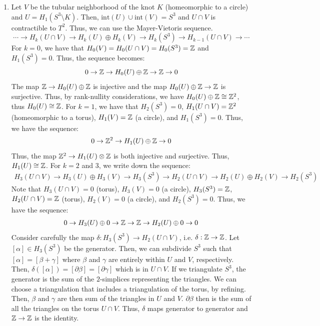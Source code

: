 \documentclass[12pt]{article}
\begin{document}
\begin{solution}
\begin{enumerate}
        \item Let $V$ be the tubular neighborhood of the knot $K$ (homeomorphic to a circle) and $U = H_1(S^3 \setminus K)$. Then, $\text{int}(U) \cup \text{int}(V) = S^3$ and $U \cap V$ is contractible to $T^2$. Thus, we can use the Mayer-Vietoris sequence.
        \[ \cdots \to H_k(U \cap V) \to H_k(U) \oplus H_k(V) \to H_k(S^3) \to H_{k-1}(U \cap V) \to \cdots\]
        For $k = 0$, we have that $H_0(V) = H_0(U \cap V) = H_0(S^3) = \mathbb Z$ and $H_1(S^3) = 0$. Thus, the sequence becomes:
        \[ 0 \to \mathbb Z \to H_0(U) \oplus \mathbb Z \to \mathbb Z \to 0 \]
        The map $\mathbb Z \to H_0(U) \oplus \mathbb Z$ is injective and the map $H_0(U) \oplus \mathbb Z \to \mathbb Z$ is surjective. Thus, by rank-nullity considerations, we have $H_0(U) \oplus \mathbb Z \cong \mathbb Z^2$, thus $H_0(U) \cong \mathbb Z$. \bbni
        For $k = 1$, we have that $H_2(S^3) = 0$, $H_1(U \cap V) = \mathbb Z^2$ (homeomorphic to a torus), $H_1(V) = \mathbb Z$ (a circle), and $H_1(S^3) = 0$. Thus, we have the sequence:
        \[ 0 \to \mathbb Z^2 \to H_1(U) \oplus \mathbb Z \to 0 \]
        Thus, the map $\mathbb Z^2 \to H_1(U) \otimes \mathbb Z$ is both injective and surjective. Thus, $H_1(U) \cong \mathbb Z$. \bbni
        For $k = 2$ and $3$, we write down the sequence: 
        \begin{align*}
            H_3(U\cap V) \to H_3(U) \oplus H_3(V) \to H_3(S^3) \to H_2(U \cap V) \to H_2(U) \oplus H_2(V) \to H_2(S^3)
        \end{align*}
        Note that $H_3(U \cap V) = 0$ (torus), $H_3(V) = 0$ (a circle), $H_3(S^3) = \mathbb Z$, $H_2(U \cap V) = \mathbb Z$ (torus), $H_2(V) = 0$ (a circle), and $H_2(S^3) = 0$. Thus, we have the sequence:
        \begin{align*}
            0 \to H_3(U) \oplus 0 \to \mathbb Z \to \mathbb Z \to H_2(U) \oplus 0 \to 0
        \end{align*}
        Consider carefully the map $\delta: H_3(S^3) \to H_2(U \cap V)$, i.e. $\delta: \mathbb Z \to \mathbb Z$. Let $[\alpha] \in H_3(S^3)$ be the generator. Then, we can subdivide $S^3$ such that $[\alpha] = [\beta+\gamma]$ where $\beta$ and $\gamma$ are entirely within $U$ and $V$, respectively. Then, $\delta([\alpha]) = [\partial \beta] = [\partial \gamma]$ which is in $U \cap V$. If we triangulate $S^3$, the generator is the sum of the $2$-simplices representing the triangles. We can choose a triangulation that includes a triangulation of the torus, by refining. Then, $\beta$ and $\gamma$ are then sum of the triangles in $U$ and $V$. $\partial \beta$ then is the sum of all the triangles on the torus $U \cap V$. Thus, $\delta$ maps generator to generator and $\mathbb Z \to \mathbb Z$ is the identity. \\

\end{enumerate}
\end{solution}
\end{document}
